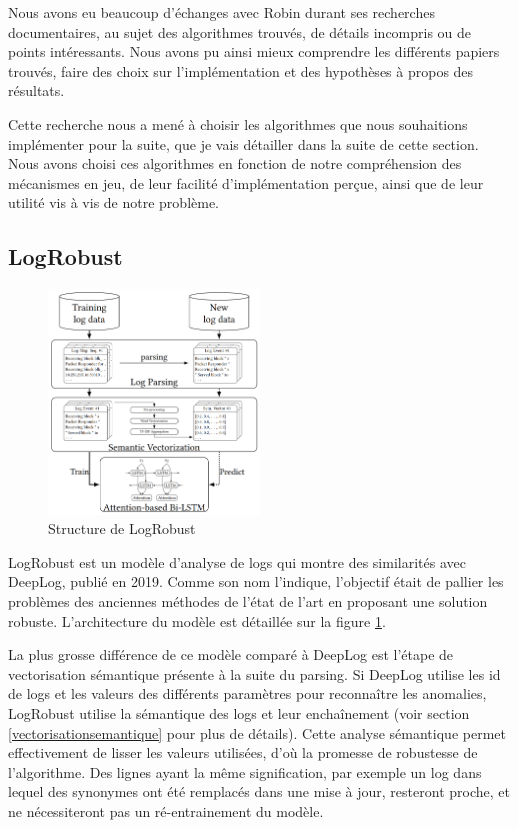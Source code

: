 \documentclass[openany, 11pt]{memoir}
\begin{document}
Nous avons eu beaucoup d'échanges avec Robin durant ses recherches documentaires, au sujet des algorithmes trouvés, de détails incompris ou de points intéressants. Nous avons pu ainsi mieux comprendre les différents papiers trouvés, faire des choix sur l'implémentation et des hypothèses à propos des résultats.

\bigskip
Cette recherche nous a mené à choisir les algorithmes que nous souhaitions implémenter pour la suite, que je vais détailler dans la suite de cette section. Nous avons choisi ces algorithmes en fonction de notre compréhension des mécanismes en jeu, de leur facilité d'implémentation perçue, ainsi que de leur utilité vis à vis de notre problème.

\subsection{LogRobust}

\begin{figure}[ht]
	\centering
	\includegraphics[width=0.5\textwidth]{images/logrobust.png}
	\caption{Structure de LogRobust}
	\label{logrobust}
\end{figure}

LogRobust \cite{logrobust} est un modèle d'analyse de \glspl{log} qui montre des similarités avec DeepLog, publié en 2019. Comme son nom l'indique, l'objectif était de pallier les problèmes des anciennes méthodes de l'état de l'art en proposant une solution robuste. L'architecture du modèle est détaillée sur la figure \ref{logrobust}.

\bigskip
La plus grosse différence de ce modèle comparé à DeepLog est l'étape de vectorisation sémantique présente à la suite du parsing. Si DeepLog utilise les id de \glspl{log} et les valeurs des différents paramètres pour reconnaître les anomalies, LogRobust utilise la sémantique des logs et leur enchaînement (voir section \ref{vectorisationsemantique} pour plus de détails). Cette analyse sémantique permet effectivement de lisser les valeurs utilisées, d'où la promesse de robustesse de l'algorithme. Des lignes ayant la même signification, par exemple un log dans lequel des synonymes ont été remplacés dans une mise à jour, resteront proche, et ne nécessiteront pas un ré-entrainement du modèle.
\end{document}
